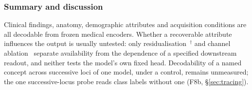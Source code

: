 \subsubsection{Summary and discussion}

Clinical findings, anatomy, demographic attributes and acquisition conditions are all decodable from
frozen medical encoders. Whether a recoverable attribute influences the output is usually untested: only
residualisation~\cite{kim2026encoding}$^{\dagger}$ and channel ablation~\cite{nooralahzadeh2026sparse}
separate availability from the dependence of a specified downstream readout, and neither tests the
model's own fixed head. Decodability of a named concept across successive loci of one model, under a
control, remains unmeasured; the one successive-locus probe reads class labels without one (F8b,
\S\ref{sec:tracing}).
